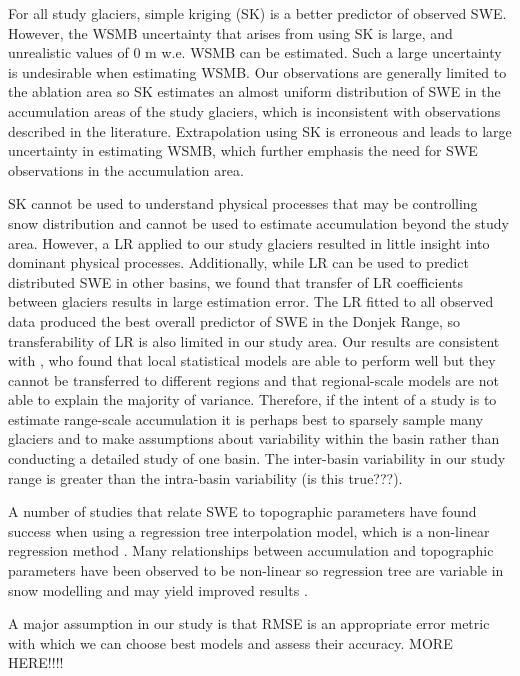 \documentclass[twocolumn,letterpaper]{igs}
\begin{document}
For all study glaciers, simple kriging (SK) is a better predictor of observed SWE. However, the WSMB uncertainty that arises from using SK is large, and unrealistic values of 0 m w.e. WSMB can be estimated. Such a large uncertainty is undesirable when estimating WSMB.  Our observations are generally limited to the ablation area so SK estimates an almost uniform distribution of SWE in the accumulation areas of the study glaciers, which is inconsistent with observations described in the literature. Extrapolation using SK is erroneous and leads to large uncertainty in estimating WSMB, which further emphasis the need for SWE observations in the accumulation area. 

SK cannot be used to understand physical processes that may be controlling snow distribution and cannot be used to estimate accumulation beyond the study area. However, a LR applied to our study glaciers resulted in little insight into dominant physical processes. Additionally, while LR can be used to predict distributed SWE in other basins, we found that transfer of LR coefficients between glaciers results in large estimation error. The LR fitted to all observed data produced the best overall predictor of SWE in the Donjek Range, so transferability of LR is also limited in our study area. Our results are consistent with \cite{Grunewald2013}, who found that local statistical models are able to perform well but  they cannot be transferred to different regions and that regional-scale models are not able to explain the majority of variance. Therefore, if the intent of a study is to estimate range-scale accumulation it is perhaps best to sparsely sample many glaciers and to make assumptions about variability within the basin rather than conducting a detailed study of one basin. The inter-basin variability in our study range is greater than the intra-basin variability (is this true???). 

A number of studies that relate SWE to topographic parameters have found success when using a regression tree interpolation model, which is a non-linear regression method \citep[e.g.][]{Elder1998, Erickson2005, Lopez2010}. Many relationships between accumulation and topographic parameters have been observed to be non-linear so regression tree are variable in snow modelling and may yield improved results \citep{Erxleben2002, Molotch2005}. 

A major assumption in our study is that RMSE is an appropriate error metric with which we can choose best models and assess their accuracy. MORE HERE!!!!
\end{document}
